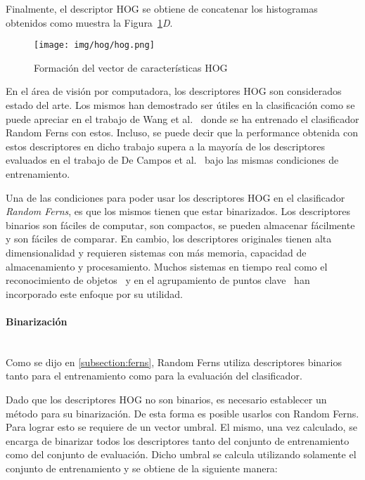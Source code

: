 	 Finalmente, el descriptor HOG se obtiene de concatenar los histogramas obtenidos como muestra la Figura~\ref{fig: Vector HOG}\textit{D}.
	
	
		\begin{figure}[htbp]
			\centering
			\centerline{ \texttt{[image: img/hog/hog.png]} }
			\caption[Extracción HOG]{Formación del vector de características HOG}
			\label{fig: Vector HOG}
		\end{figure}
		
	En el área de visión por computadora, los descriptores HOG son considerados estado del arte. Los mismos han demostrado ser útiles en la clasificación como se puede apreciar en el trabajo de Wang et al.~\cite{wang} donde se ha entrenado el clasificador Random Ferns con estos. Incluso, se puede decir que la performance obtenida con estos descriptores en dicho trabajo supera a la mayoría de los descriptores evaluados en el trabajo de De Campos et al.~\cite{dCBV09} bajo las mismas condiciones de entrenamiento.
	
	Una de las condiciones para poder usar los descriptores HOG en el clasificador \textit{Random Ferns}, es que los mismos tienen que estar binarizados. Los descriptores binarios son fáciles de computar, son compactos, se pueden almacenar fácilmente y son fáciles de comparar. En cambio, los descriptores originales tienen alta dimensionalidad y requieren sistemas con más memoria, capacidad de almacenamiento y procesamiento. Muchos sistemas en tiempo real como el reconocimiento de objetos~\cite{SJC08} y en el agrupamiento de puntos clave~\cite{OFL07} han incorporado este enfoque por su utilidad.

	
	\paragraph{Binarización} ~\\
	
		Como se dijo en \ref{subsection:ferns}, Random Ferns utiliza descriptores binarios tanto para el entrenamiento como para la evaluación del clasificador.
		
		Dado que los descriptores HOG no son binarios, es necesario establecer un método para su binarización. De esta forma es posible usarlos con Random Ferns. Para lograr esto se requiere de un vector umbral. El mismo, una vez  calculado, se encarga de binarizar todos los descriptores tanto del conjunto de entrenamiento como del conjunto de evaluación. Dicho umbral se calcula utilizando solamente el conjunto de entrenamiento y se obtiene de la siguiente manera:
		
